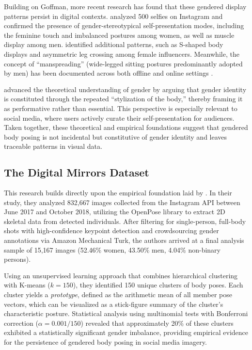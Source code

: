 \documentclass[12pt, a4paper]{article}
\begin{document}
Building on Goffman, more recent research has found that these gendered display patterns persist in digital contexts. \citet{doring2016selfies} analyzed 500 selfies on Instagram and confirmed the presence of gender-stereotypical self-presentation modes, including the feminine touch and imbalanced postures among women, as well as muscle display among men. \citet{gotz2019bein} identified additional patterns, such as S-shaped body displays and asymmetric leg crossing among female influencers. Meanwhile, the concept of ``manspreading'' (wide-legged sitting postures predominantly adopted by men) has been documented across both offline and online settings \citep{jane2017manspreading}.

\citet{butler1990gender} advanced the theoretical understanding of gender by arguing that gender identity is constituted through the repeated ``stylization of the body,'' thereby framing it as performative rather than essential. This perspective is especially relevant to social media, where users actively curate their self-presentation for audiences. Taken together, these theoretical and empirical foundations suggest that gendered body posing is not incidental but constitutive of gender identity and leaves traceable patterns in visual data.


\subsection{The Digital Mirrors Dataset}
\label{sec:dataset}

This research builds directly upon the empirical foundation laid by \citet{tsolak2025unveiling}. In their study, they analyzed 832,667 images collected from the Instagram API between June 2017 and October 2018, utilizing the OpenPose library \citep{openpose2019} to extract 2D skeletal data from detected individuals. After filtering for single-person, full-body shots with high-confidence keypoint detection and crowdsourcing gender annotations via Amazon Mechanical Turk, the authors arrived at a final analysis sample of 15,167 images (52.46\% women, 43.50\% men, 4.04\% non-binary persons).

Using an unsupervised learning approach that combines hierarchical clustering with K-means ($k=150$), they identified 150 unique clusters of body poses. Each cluster yields a \textit{prototype}, defined as the arithmetic mean of all member pose vectors, which can be visualized as a stick-figure summary of the cluster's characteristic posture. Statistical analysis using multinomial tests with Bonferroni correction ($\alpha = 0.001/150$) revealed that approximately 20\% of these clusters exhibited a statistically significant gender imbalance, providing empirical evidence for the persistence of gendered body posing in social media imagery.
\end{document}
